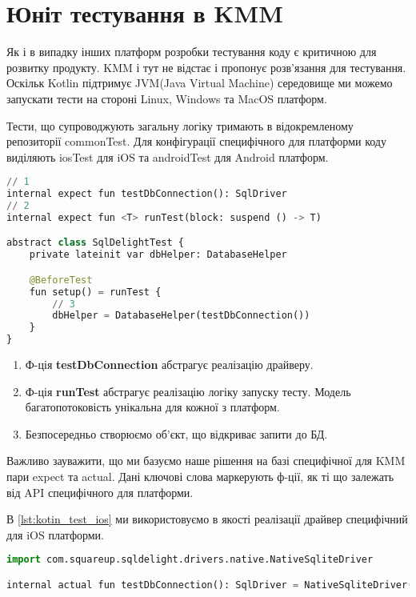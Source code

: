\section{Юніт тестування в KMM}
\label{section.2.12}

Як і в випадку інших платформ розробки тестування коду є критичною для розвитку продукту.
KMM і тут не відстає і пропонує розв'язання для тестування.
Оскільк Kotlin підтримує JVM(Java Virtual Machine) середовище ми можемо запускати тести на стороні Linux, Windows та MacOS платформ.

Тести, що супроводжують загальну логіку тримають в відокремленому репозиторії commonTest.
Для конфігурації специфічного для платформи коду виділяють iosTest для iOS та androidTest для Android платформ.

\begin{lstlisting}[style=light, language=Python,label={lst:kotin_test_common},caption=Common Unit Test]
// 1
internal expect fun testDbConnection(): SqlDriver
// 2
internal expect fun <T> runTest(block: suspend () -> T)

abstract class SqlDelightTest {
    private lateinit var dbHelper: DatabaseHelper

    @BeforeTest
    fun setup() = runTest {
        // 3
        dbHelper = DatabaseHelper(testDbConnection())
    }
}
\end{lstlisting}

\begin{enumerate}
    \item Ф-ція \textbf{testDbConnection} абстрагує реалізацію драйверу.
    \item Ф-ція \textbf{runTest} абстрагує реалізацію логіку запуску тесту. Модель багатопотоковість унікальна для кожної з платформ.
    \item Безпосередньо створюємо об'єкт, що відкриває запити до БД.
\end{enumerate}

Важливо зауважити, що ми базуємо наше рішення на базі специфічної для KMM пари expect та actual.
Дані ключові слова маркерують ф-ції, як ті що залежать від API специфічного для платформи.

В \ref{lst:kotin_test_ios} ми використовуємо в якості реалізації драйвер специфічний для iOS платформи.

\begin{lstlisting}[style=light, language=Python,label={lst:kotin_test_ios},caption=iOS SQLDriver]
import com.squareup.sqldelight.drivers.native.NativeSqliteDriver

internal actual fun testDbConnection(): SqlDriver = NativeSqliteDriver(BAIDB.Schema, "baidb")
\end{lstlisting}


